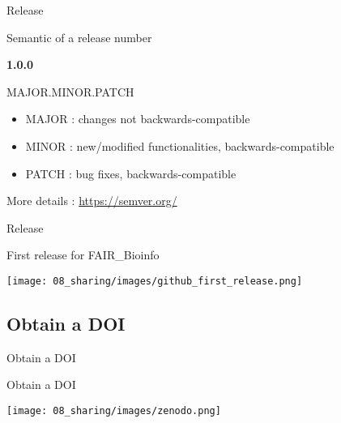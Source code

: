 \begin{frame}{Release}

Semantic of a release number

\begin{center}
    \textbf{1.0.0}
    
    MAJOR.MINOR.PATCH
    
\end{center}
\par
\begin{itemize}
    \item MAJOR : changes not backwards-compatible
    \item MINOR : new/modified functionalities, backwards-compatible
    \item PATCH : bug fixes, backwards-compatible
\end{itemize}

More details : \url{https://semver.org/}
\end{frame}

\begin{frame}{Release}

First release for FAIR\_Bioinfo

\begin{center}
    \texttt{[image: 08\_sharing/images/github\_first\_release.png]}
\end{center}

\end{frame}

\subsection{Obtain a DOI}

\begin{frame}{}

\huge{Obtain a DOI}

\end{frame}


\begin{frame}{Obtain a DOI}

\begin{center}
    \texttt{[image: 08\_sharing/images/zenodo.png]}
\end{center}

\end{frame}

